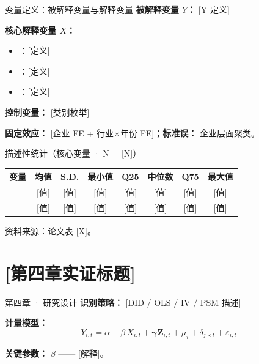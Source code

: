 \documentclass[10pt,aspectratio=169]{beamer}
\begin{document}
\begin{frame}{变量定义：被解释变量与解释变量}
  \textbf{被解释变量 $Y$：} [Y 定义]

  \vspace{0.4em}
  \textbf{核心解释变量 $X$：}
  \begin{itemize}
    \item [X1]：[定义]
    \item [X2]：[定义]
    \item [X3]：[定义]
  \end{itemize}

  \vspace{0.3em}
  \textbf{控制变量：} [类别枚举]

  \vspace{0.3em}
  \textbf{固定效应：} [企业 FE + 行业$\times$年份 FE]；\textbf{标准误：} 企业层面聚类。
\end{frame}

\begin{frame}{描述性统计（核心变量 · N = [N]）}
  \centering\scriptsize
  \setlength{\tabcolsep}{4pt}
  \begin{tabular}{lccccccc}
    \toprule
    变量 & 均值 & S.D. & 最小值 & Q25 & 中位数 & Q75 & 最大值 \\
    \midrule
    [Y 变量]    & [值]  & [值] & [值]  & [值]  & [值]  & [值]  & [值]   \\
    [X1]        & [值]  & [值] & [值]  & [值]  & [值]  & [值]  & [值]   \\
    \bottomrule
  \end{tabular}

  \vspace{0.4em}
  \footnotesize 资料来源：论文表 [X]。
\end{frame}

\section{[第四章实证标题]}

\begin{frame}{第四章 · 研究设计}
  \textbf{识别策略：} [DID / OLS / IV / PSM 描述]

  \vspace{0.4em}
  \textbf{计量模型：}
  \[
    Y_{i,t} = \alpha + \beta\,X_{i,t} + \boldsymbol\gamma\mathbf{Z}_{i,t}
    + \mu_i + \delta_{j\times t} + \varepsilon_{i,t}
  \]

  \vspace{0.3em}
  \textbf{关键参数：} $\beta$ —— [解释]。
\end{frame}
\end{document}
